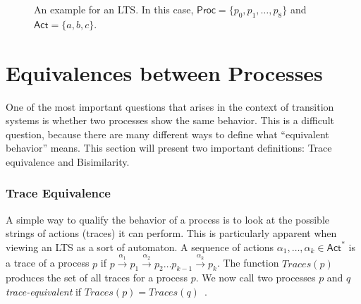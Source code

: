 \begin{figure}[tb]
\begin{center}
\end{center}
\caption{An example for an LTS\@. In this case,
    $\mathsf{Proc} = \{p_0, p_1, \ldots, p_8\}$ and
    $\mathsf{Act} = \{a, b, c\}$.
}%
\label{fig:example_lts}
\end{figure}


\section{Equivalences between Processes}

One of the most important questions that arises in the context of transition
systems is whether two processes show the same behavior.
This is a difficult question,
because there are many different ways to define
what \enquote{equivalent behavior} means.
This section will present two important definitions: Trace equivalence and
Bisimilarity.

\subsubsection{Trace Equivalence}

A simple way to qualify the behavior of a process is to look at the possible
strings of actions (traces) it can perform.
This is particularly apparent when viewing an LTS as a sort of automaton.
A sequence of actions $\alpha_1, \ldots, \alpha_k \in \mathsf{Act}^*$
is a trace of a process $p$ if
$p \xrightarrow{\alpha_1} p_1 \xrightarrow{\alpha_2} p_2
\ldots p_{k-1} \xrightarrow{\alpha_k} p_k$.
The function $\mathit{Traces}(p)$ produces the set of all traces
for a process $p$.
We now call two processes $p$ and $q$ \emph{trace-equivalent}
if $\mathit{Traces}(p) = \mathit{Traces}(q)$~\cite{reactive_systems}.

